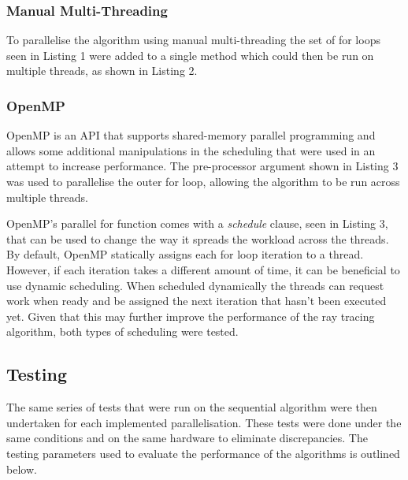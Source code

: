 \documentclass[12pt,journal,transmag]{IEEEtran}
\begin{document}
	\subsubsection{Manual Multi-Threading}
	To parallelise the algorithm using manual multi-threading the set of for loops seen in Listing 1 were added to a single method which could then be run on multiple threads, as shown in Listing 2.
	
	
	
	\subsubsection{OpenMP}
	OpenMP is an API that supports shared-memory parallel programming and allows some additional manipulations in the scheduling that were used in an attempt to increase performance. The pre-processor argument shown in Listing 3 was used to parallelise the outer for loop, allowing the algorithm to be run across multiple threads.
	
	
	
	OpenMP's parallel for function comes with a \textit{schedule} clause, seen in Listing 3, that can be used to change the way it spreads the workload across the threads. By default, OpenMP statically assigns each for loop iteration to a thread. However, if each iteration takes a different amount of time, it can be beneficial to use dynamic scheduling. When scheduled dynamically the threads can request work when ready and be assigned the next iteration that hasn't been executed yet. Given that this may further improve the performance of the ray tracing algorithm, both types of scheduling were tested.
	
	\subsection{Testing}
	The same series of tests that were run on the sequential algorithm were then undertaken for each implemented parallelisation. These tests were done under the same conditions and on the same hardware to eliminate discrepancies. The testing parameters used to evaluate the performance of the algorithms is outlined below.
	
\end{document}
